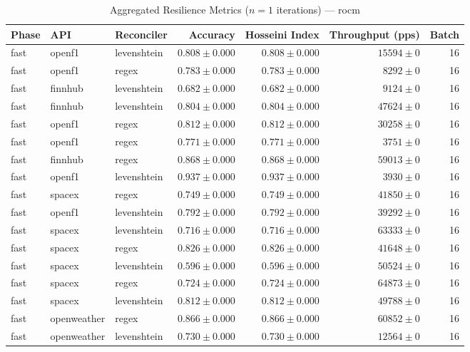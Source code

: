 
\begin{table}[htbp]
\caption{Aggregated Resilience Metrics ($n=1$ iterations) --- rocm}
\begin{tabular}{l l l r r r r}
\hline
Phase & API & Reconciler & Accuracy & Hosseini Index & Throughput (pps) & Batch \\
\hline
fast & openf1 & levenshtein & $0.808\pm0.000$ & $0.808\pm0.000$ & $15594\pm0$ & 16 \\
fast & openf1 & regex & $0.783\pm0.000$ & $0.783\pm0.000$ & $8292\pm0$ & 16 \\
fast & finnhub & levenshtein & $0.682\pm0.000$ & $0.682\pm0.000$ & $9124\pm0$ & 16 \\
fast & finnhub & levenshtein & $0.804\pm0.000$ & $0.804\pm0.000$ & $47624\pm0$ & 16 \\
fast & openf1 & regex & $0.812\pm0.000$ & $0.812\pm0.000$ & $30258\pm0$ & 16 \\
fast & openf1 & regex & $0.771\pm0.000$ & $0.771\pm0.000$ & $3751\pm0$ & 16 \\
fast & finnhub & regex & $0.868\pm0.000$ & $0.868\pm0.000$ & $59013\pm0$ & 16 \\
fast & openf1 & levenshtein & $0.937\pm0.000$ & $0.937\pm0.000$ & $3930\pm0$ & 16 \\
fast & spacex & regex & $0.749\pm0.000$ & $0.749\pm0.000$ & $41850\pm0$ & 16 \\
fast & openf1 & levenshtein & $0.792\pm0.000$ & $0.792\pm0.000$ & $39292\pm0$ & 16 \\
fast & spacex & levenshtein & $0.716\pm0.000$ & $0.716\pm0.000$ & $63333\pm0$ & 16 \\
fast & spacex & regex & $0.826\pm0.000$ & $0.826\pm0.000$ & $41648\pm0$ & 16 \\
fast & spacex & levenshtein & $0.596\pm0.000$ & $0.596\pm0.000$ & $50524\pm0$ & 16 \\
fast & spacex & regex & $0.724\pm0.000$ & $0.724\pm0.000$ & $64873\pm0$ & 16 \\
fast & spacex & levenshtein & $0.812\pm0.000$ & $0.812\pm0.000$ & $49788\pm0$ & 16 \\
fast & openweather & regex & $0.866\pm0.000$ & $0.866\pm0.000$ & $60852\pm0$ & 16 \\
fast & openweather & levenshtein & $0.730\pm0.000$ & $0.730\pm0.000$ & $12564\pm0$ & 16 \\

\end{tabular}
\end{table}
